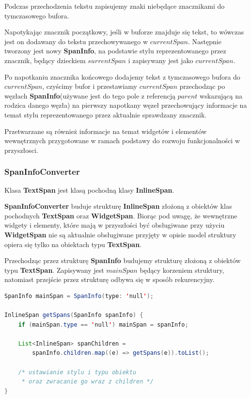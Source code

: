 Podczas przechodzenia tekstu zapisujemy znaki niebędące znacznikami do tymczasowego bufora.

Napotykając znacznik początkowy, jeśli w buforze znajduje się tekst, to wówczas jest on dodawany do tekstu przechowywanego w $currentSpan$. Następnie tworzony jest nowy \textbf{SpanInfo}, na podstawie stylu reprezentowanego przez znacznik, będący dzieckiem $surrentSpan$ i zapisywany jest jako $currentSpan$. 

Po napotkaniu znacznika końcowego dodajemy tekst z tymczasowego bufora do $currentSpan$, czyścimy bufor i przestawiamy $currentSpan$ przechodząc po węzłach \textbf{SpanInfo}(używane jest do tego pole z referencją $parent$ wskazującą na rodzica danego węzła) na pierwszy napotkany węzeł przechowujący informacje na temat stylu reprezentowanego przez aktualnie sprawdzany znacznik.

Przetwarzane są również informacje na temat widgetów i elementów wewnętrznych przygotowane w ramach podstawy do rozwoju funkcjonalności w przyszłosci.

\subsubsection{SpanInfoConverter}

Klasa \textbf{TextSpan} jest klasą pochodną klasy \textbf{InlineSpan}.

\textbf{SpanInfoConverter} buduje strukturę \textbf{InlineSpan} złożoną z obiektów klas pochodnych \textbf{TextSpan} oraz \textbf{WidgetSpan}. Biorąc pod uwagę, że wewnętrzne widgety i elementy, które mają w przyszłości być obsługiwane przy użyciu \textbf{WidgetSpan} nie są aktualnie obsługiwane przyjęty w opisie model struktury opiera się tylko na obiektach typu \textbf{TextSpan}.

Przechodząc przez strukturę \textbf{SpanInfo} budujemy strukturę złożoną z obiektów typu \textbf{TextSpan}. Zapisywany jest $mainSpan$ będący korzeniem struktury, natomiast przejście przez strukturę odbywa się w sposób rekurencyjny.

\begin{lstlisting}[language=Java]
SpanInfo mainSpan = SpanInfo(type: 'null');

InlineSpan getSpans(SpanInfo spanInfo) {
    if (mainSpan.type == 'null') mainSpan = spanInfo;

    List<InlineSpan> spanChildren =
        spanInfo.children.map((e) => getSpans(e)).toList();

    /* ustawianie stylu i typu obiektu 
     * oraz zwracanie go wraz z children */
}
\end{lstlisting}
